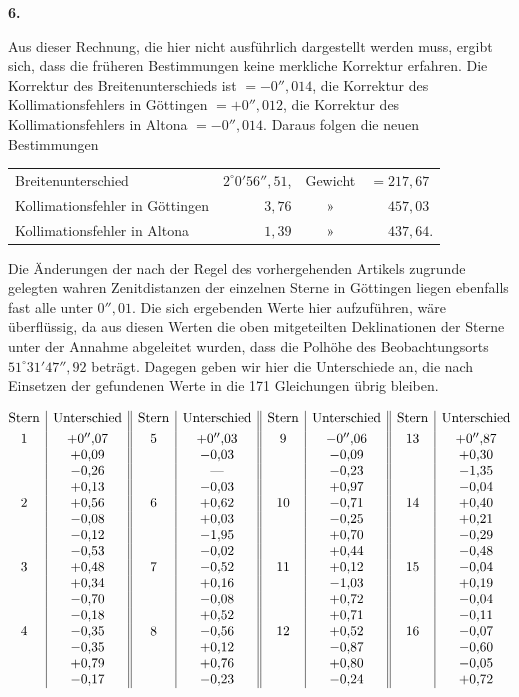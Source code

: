 \begin{center}\textbf{6.}\end{center}

Aus dieser Rechnung, die hier nicht ausführlich dargestellt werden muss,
ergibt sich, dass die früheren Bestimmungen keine merkliche Korrektur erfahren.
Die Korrektur des Breitenunterschieds ist \(=-0''{,}014\),
die Korrektur des Kollimationsfehlers in Göttingen \(=+0''{,}012\), die
Korrektur des Kollimationsfehlers in Altona \(=-0''{,}014\). Daraus folgen die neuen
Bestimmungen
\begin{center}
\begin{tabular}{@{}l@{\quad}r@{\enspace}c@{\enspace}l@{}}
Breitenunterschied & \(2^\circ0'56''{,}51\), & Gewicht & \(=217{,}67\)\\
Kollimationsfehler in Göttingen & \(3{,}76\) & » & \(\phantom{=}457{,}03\)\\
Kollimationsfehler in Altona & \(1{,}39\) & » & \(\phantom{=}437{,}64\).
\end{tabular}
\end{center}

Die Änderungen der nach der Regel des vorhergehenden Artikels
zugrunde gelegten wahren Zenitdistanzen der einzelnen Sterne in Göttingen
liegen ebenfalls fast alle unter \(0''{,}01\). Die sich ergebenden Werte hier
aufzuführen, wäre überflüssig, da aus diesen Werten die oben
mitgeteilten Deklinationen der Sterne unter der Annahme abgeleitet wurden,
dass die Polhöhe des Beobachtungsorts \(51^\circ31'47''{,}92\) beträgt. Dagegen geben wir hier die
Unterschiede an, die nach Einsetzen der gefundenen Werte in die
171 Gleichungen übrig bleiben.

{\small
\[
\begin{array}{@{}c|c||c|c||c|c||c|c@{}}
\text{Stern}&\text{Unterschied}&\text{Stern}&\text{Unterschied}&
\text{Stern}&\text{Unterschied}&\text{Stern}&\text{Unterschied}\\[.8ex]
1&+0''{,}07&5&+0''{,}03&9&-0''{,}06&13&+0''{,}87\\
&+0{,}09&&-0{,}03&&-0{,}09&&+0{,}30\\
&-0{,}26&&\text{—}&&-0{,}23&&-1{,}35\\
&+0{,}13&&-0{,}03&&+0{,}97&&-0{,}04\\
2&+0{,}56&6&+0{,}62&10&-0{,}71&14&+0{,}40\\
&-0{,}08&&+0{,}03&&-0{,}25&&+0{,}21\\
&-0{,}12&&-1{,}95&&+0{,}70&&-0{,}29\\
&-0{,}53&&-0{,}02&&+0{,}44&&-0{,}48\\
3&+0{,}48&7&-0{,}52&11&+0{,}12&15&-0{,}04\\
&+0{,}34&&+0{,}16&&-1{,}03&&+0{,}19\\
&-0{,}70&&-0{,}08&&+0{,}72&&-0{,}04\\
&-0{,}18&&+0{,}52&&+0{,}71&&-0{,}11\\
4&-0{,}35&8&-0{,}56&12&+0{,}52&16&-0{,}07\\
&-0{,}35&&+0{,}12&&-0{,}87&&-0{,}60\\
&+0{,}79&&+0{,}76&&+0{,}80&&-0{,}05\\
&-0{,}17&&-0{,}23&&-0{,}24&&+0{,}72
\end{array}
\]
\par
}

